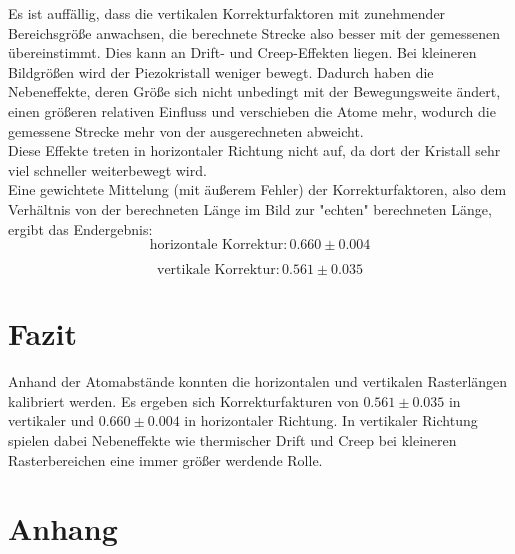 \documentclass[12pt,a4paper]{article}
\begin{document}
Es ist auffällig, dass die vertikalen Korrekturfaktoren mit zunehmender Bereichsgröße anwachsen, die berechnete Strecke also besser mit der gemessenen übereinstimmt. Dies kann an Drift- und Creep-Effekten liegen. Bei kleineren Bildgrößen wird der Piezokristall weniger bewegt. Dadurch haben die Nebeneffekte, deren Größe sich nicht unbedingt mit der Bewegungsweite ändert, einen größeren relativen Einfluss und verschieben die Atome mehr, wodurch die gemessene Strecke mehr von der ausgerechneten abweicht.\\
Diese Effekte treten in horizontaler Richtung nicht auf, da dort der Kristall sehr viel schneller weiterbewegt wird.\\

Eine gewichtete Mittelung (mit äußerem Fehler) der Korrekturfaktoren, also dem Verhältnis von der berechneten Länge im Bild zur "echten" berechneten Länge, ergibt das Endergebnis:
\begin{equation*}
\boxed{\textrm{horizontale Korrektur}: 0.660\pm 0.004}
\end{equation*}

\begin{equation*}
\boxed{\textrm{vertikale Korrektur}: 0.561\pm 0.035}
\end{equation*}

\section{Fazit}

Anhand der Atomabstände konnten die horizontalen und vertikalen Rasterlängen kalibriert werden. Es ergeben sich Korrekturfakturen von 
$0.561\pm 0.035$ in vertikaler und $0.660\pm 0.004$ in horizontaler Richtung. In vertikaler Richtung spielen dabei Nebeneffekte wie thermischer Drift und Creep bei kleineren Rasterbereichen eine immer größer werdende Rolle.
\section{Anhang}
\end{document}

